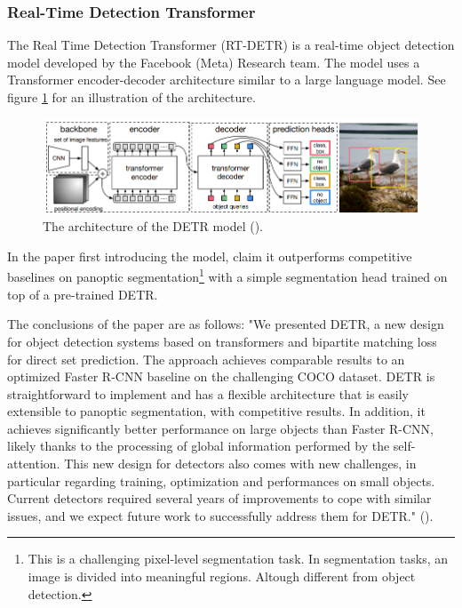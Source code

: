 \subsubsection{Real-Time Detection Transformer}
\label{sec:rtdetr}
The Real Time Detection Transformer (RT-DETR) is a real-time object detection model developed by the Facebook (Meta) Research team. The model uses a Transformer encoder-decoder architecture similar to a large language model. See figure \ref{fig:detrarchitecture} for an illustration of the architecture.

\begin{figure}
    \centering
    \includegraphics[width=1\linewidth]{Images/Diagrams/DETR2.png}
    \caption{The architecture of the DETR model (\cite{carion2020endtoend}).}
    \label{fig:detrarchitecture}
\end{figure}

In the paper first introducing the model, \citeauthor{carion2020endtoend} claim it outperforms competitive baselines on panoptic segmentation\footnote{This is a challenging pixel-level segmentation task. In segmentation tasks, an image is divided into meaningful regions. Altough different from object detection.} with a simple segmentation head trained on top of a pre-trained DETR. 

The conclusions of the paper are as follows:
"We presented DETR, a new design for object detection systems based on transformers and bipartite matching loss for direct set prediction. The approach achieves comparable results to an optimized Faster R-CNN baseline on the challenging COCO dataset. DETR is straightforward to implement and has a flexible architecture that is easily extensible to panoptic segmentation, with competitive results. In addition, it achieves significantly better performance on large objects than Faster R-CNN, likely thanks to the processing of global information performed by the self-attention. This new design for detectors also comes with new challenges, in particular regarding training,  optimization and performances on small objects. Current detectors required several years of improvements to cope with similar issues, and we expect future work to successfully address them for DETR." (\cite{carion2020endtoend}).

